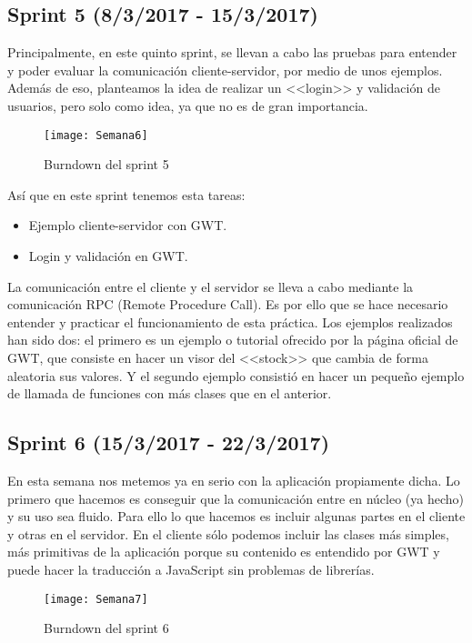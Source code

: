 \subsection{Sprint 5 (8/3/2017 - 15/3/2017)}

Principalmente, en este quinto sprint, se llevan a cabo las pruebas para entender y poder evaluar la comunicación cliente-servidor, por medio de unos ejemplos. Además de eso, planteamos la idea de realizar un <<login>> y validación de usuarios, pero solo como idea, ya que no es de gran importancia.

\begin{figure}[h]
\centering
\texttt{[image: Semana6]}
\caption{Burndown del sprint 5}
\label{fig:A.2.6}
\end{figure}


Así que en este sprint tenemos esta tareas:

\begin{itemize}
\item Ejemplo cliente-servidor con GWT.
\item Login y validación en GWT.
\end{itemize}

La comunicación entre el cliente y el servidor se lleva a cabo mediante la comunicación RPC (Remote Procedure Call). Es por ello que se hace necesario entender y practicar el funcionamiento de esta práctica. Los ejemplos realizados han sido dos: el primero es un ejemplo o tutorial ofrecido por la página oficial de GWT, que consiste en hacer un visor del <<stock>> que cambia de forma aleatoria sus valores. Y el segundo ejemplo consistió en hacer un pequeño ejemplo de llamada de funciones con más clases que en el anterior.


\subsection{Sprint 6 (15/3/2017 - 22/3/2017)}

En esta semana nos metemos ya en serio con la aplicación propiamente dicha. Lo primero que hacemos es conseguir que la comunicación entre en núcleo (ya hecho) y su uso sea fluido. Para ello lo que hacemos es incluir algunas partes en el cliente y otras en el servidor. En el cliente sólo podemos incluir las clases más simples, más primitivas de la aplicación porque su contenido es entendido por GWT y puede hacer la traducción a JavaScript sin problemas de librerías.

\begin{figure}[h]
\centering
\texttt{[image: Semana7]}
\caption{Burndown del sprint 6}
\label{fig:A.2.6}
\end{figure}

